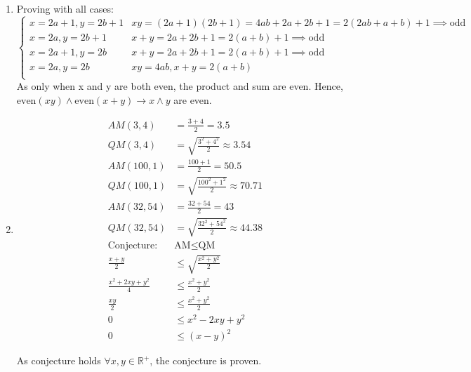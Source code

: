 \documentclass{article}
\begin{document}
\begin{enumerate}[label=\alph*.]
    \item Proving with all cases: \[\begin{cases}
                  x = 2a + 1, y = 2b + 1 & xy = (2a + 1)(2b + 1) = 4ab + 2a + 2b + 1 = 2(2ab + a + b) + 1 \implies \text{odd} \\
                  x = 2a, y = 2b + 1     & x + y = 2a + 2b + 1 = 2(a + b) + 1 \implies \text{odd}                             \\
                  x = 2a + 1, y = 2b     & x + y = 2a + 2b + 1 = 2(a + b) + 1 \implies \text{odd}                             \\
                  x = 2a, y = 2b         & xy = 4ab, x + y = 2(a+b)                                                           \\
              \end{cases}\]
          As only when x and y are both even, the product and sum are even. Hence, $\text{even}(xy) \land \text{even}(x + y) \to x \land y$ are even.
    \item \[\begin{aligned}
                  AM(3, 4)                  & = \frac{3 + 4}{2} = 3.5                      \\
                  QM(3, 4)                  & = \sqrt{\frac{3^2 + 4^2}{2}} \approx 3.54    \\
                  AM(100, 1)                & = \frac{100 + 1}{2} = 50.5                   \\
                  QM(100, 1)                & = \sqrt{\frac{100^2 + 1^2}{2}} \approx 70.71 \\
                  AM(32, 54)                & = \frac{32 + 54}{2} = 43                     \\
                  QM(32, 54)                & = \sqrt{\frac{32^2 + 54^2}{2}} \approx 44.38 \\
                  \text{Conjecture: }       & \text{AM} \leq \text{QM}                     \\
                  \frac{x + y}{2}           & \leq \sqrt{\frac{x^2 + y^2}{2}}              \\
                  \frac{x^2 + 2xy + y^2}{4} & \leq \frac{x^2 + y^2}{2}                     \\
                  \frac{xy}{2}              & \leq \frac{x^2 + y^2}{2}                     \\
                  0                         & \leq x^2 - 2xy + y^2                         \\
                  0                         & \leq (x - y)^2
              \end{aligned}\]

          As conjecture holds $\forall x, y \in \mathbb{R}^+$, the conjecture is proven.
\end{enumerate}
\end{document}
